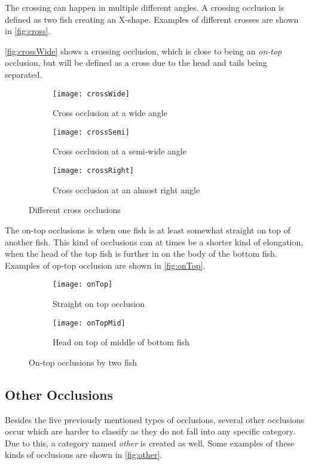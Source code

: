 The crossing can happen in multiple different angles. A crossing occlusion is defined as two fish creating an X-shape. Examples of different crosses are shown in \autoref{fig:cross}. 

\autoref{fig:crossWide} shows a crossing occlusion, which is close to being an \textit{on-top} occlusion, but will be defined as a cross due to the head and tails being separated.

\begin{figure}[H]
	\centering
	\begin{subfigure}[b]{0.3\textwidth}
		\texttt{[image: crossWide]}
		\caption{Cross occlusion at a wide angle}
		\label{fig:crossWide}
	\end{subfigure}
	\begin{subfigure}[b]{0.3\textwidth}
		\texttt{[image: crossSemi]}
		\caption{Cross occlusion at a semi-wide angle}
		\label{fig:crossSemi}
	\end{subfigure}
	\begin{subfigure}[b]{0.3\textwidth}
		\texttt{[image: crossRight]}
		\caption{Cross occlusion at an almost right angle}
		\label{fig:crossRight}
	\end{subfigure}
	\caption{Different cross occlusions}
	\label{fig:cross}
\end{figure}

The on-top occlusions is when one fish is at least somewhat straight on top of another fish. This kind of occlusions can at times be a shorter kind of elongation, when the head of the top fish is further in on the body of the bottom fish. Examples of op-top occlusion are shown in \autoref{fig:onTop}.

\begin{figure}[H]
	\centering
	\begin{subfigure}[b]{0.47\textwidth}
		\texttt{[image: onTop]}
		\caption{Straight on top occlusion}
		\label{fig:onTopFull}
	\end{subfigure}
	\begin{subfigure}[b]{0.47\textwidth}
		\texttt{[image: onTopMid]}
		\caption{Head on top of middle of bottom fish}
		\label{fig:onTopMid}
	\end{subfigure}
	\caption{On-top occlusions by two fish}
	\label{fig:onTop}
\end{figure}

\subsection{Other Occlusions}
Besides the five previously mentioned types of occlusions, several other occlusions occur which are harder to classify as they do not fall into any specific category. Due to this, a category named \textit{other} is created as well. Some examples of these kinds of occlusions are shown in \autoref{fig:other}.

